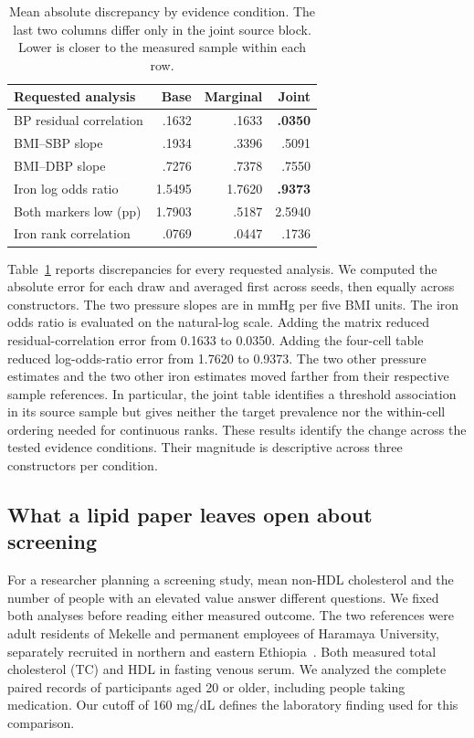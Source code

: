 \documentclass[sigconf,anonymous,review]{acmart}
\begin{document}
\begin{table}[t]
\caption{Mean absolute discrepancy by evidence condition. The last two columns differ only in the joint source block. Lower is closer to the measured sample within each row.}
\label{tab:evidence}
\centering
\begin{tabular}{@{}lrrr@{}}
\toprule
Requested analysis & Base & Marginal & Joint\\
\midrule
BP residual correlation & .1632 & .1633 & \textbf{.0350}\\
BMI--SBP slope & .1934 & .3396 & .5091\\
BMI--DBP slope & .7276 & .7378 & .7550\\
Iron log odds ratio & 1.5495 & 1.7620 & \textbf{.9373}\\
Both markers low (pp) & 1.7903 & .5187 & 2.5940\\
Iron rank correlation & .0769 & .0447 & .1736\\
\bottomrule
\end{tabular}
\end{table}

Table~\ref{tab:evidence} reports discrepancies for every requested analysis. We computed the absolute error for each draw and averaged first across seeds, then equally across constructors. The two pressure slopes are in mmHg per five BMI units. The iron odds ratio is evaluated on the natural-log scale. Adding the matrix reduced residual-correlation error from 0.1633 to 0.0350. Adding the four-cell table reduced log-odds-ratio error from 1.7620 to 0.9373. The two other pressure estimates and the two other iron estimates moved farther from their respective sample references. In particular, the joint table identifies a threshold association in its source sample but gives neither the target prevalence nor the within-cell ordering needed for continuous ranks. These results identify the change across the tested evidence conditions. Their magnitude is descriptive across three constructors per condition.

\subsection{What a lipid paper leaves open about screening}
\label{sec:nonhdl}
For a researcher planning a screening study, mean non-HDL cholesterol and the number of people with an elevated value answer different questions. We fixed both analyses before reading either measured outcome. The two references were adult residents of Mekelle and permanent employees of Haramaya University, separately recruited in northern and eastern Ethiopia~\cite{mekelle,haramaya}. Both measured total cholesterol (TC) and HDL in fasting venous serum. We analyzed the complete paired records of participants aged 20 or older, including people taking medication. Our cutoff of 160 mg/dL defines the laboratory finding used for this comparison.
\end{document}
